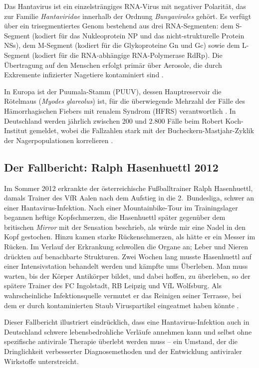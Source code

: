 ﻿\documentclass[a4paper,12pt]{article}
\theoremstyle{definition}
\begin{document}
Das Hantavirus ist ein einzelstr\"angiges RNA-Virus mit negativer Polarit\"at,
das zur Familie \emph{Hantaviridae} innerhalb der Ordnung \emph{Bunyavirales}
geh\"ort. Es verf\"ugt \"uber ein trisegmentiertes Genom bestehend aus drei
RNA-Segmenten: dem S-Segment (kodiert f\"ur das Nukleoprotein NP und das
nicht-strukturelle Protein NSs), dem M-Segment (kodiert f\"ur die Glykoproteine
Gn und Gc) sowie dem L-Segment (kodiert f\"ur die RNA-abh\"angige RNA-Polymerase
RdRp). Die \"Ubertragung auf den Menschen erfolgt prim\"ar \"uber Aerosole,
die durch Exkremente infizierter Nagetiere kontaminiert sind \cite{Jonsson2010}.

In Europa ist der Puumala-Stamm (PUUV), dessen Hauptreservoir die R\"otelmaus
(\emph{Myodes glareolus}) ist, f\"ur die \"uberwiegende Mehrzahl der F\"alle
des H\"amorrhagischen Fiebers mit renalem Syndrom (HFRS) verantwortlich
\cite{Vaheri2013}. In Deutschland werden j\"ahrlich zwischen 200 und 2.800
F\"alle beim Robert Koch-Institut gemeldet, wobei die Fallzahlen stark
mit der Bucheckern-Mastjahr-Zyklik der Nagerpopulationen korrelieren
\cite{RKI2023}.

\subsection{Der Fallbericht: Ralph Hasenhuettl 2012}

Im Sommer 2012 erkrankte der \"osterreichische Fu{\ss}balltrainer Ralph Hasenhuettl,
damals Trainer des VfR Aalen nach dem Aufstieg in die 2.~Bundesliga, schwer
an einer Hantavirus-Infektion. Nach einer Mountainbike-Tour im Trainingslager
begannen heftige Kopfschmerzen, die Hasenhuettl sp\"ater gegen\"uber dem
britischen \emph{Mirror} mit der Sensation beschrieb, \glqq als w\"urde mir
eine Nadel in den Kopf gestochen\grqq. Hinzu kamen starke R\"uckenschmerzen,
als h\"atte er \glqq ein Messer im R\"ucken\grqq. Im Verlauf der Erkrankung
schwollen die Organe an; Leber und Nieren dr\"uckten auf benachbarte Strukturen.
Zwei Wochen lang musste Hasenhuettl auf einer Intensivstation behandelt werden
und k\"ampfte ums \"Uberleben. \glqq Man muss warten, bis der K\"orper
Antik\"orper bildet, und dabei hoffen, zu \"uberleben\grqq, so der
sp\"atere Trainer des FC Ingolstadt, RB Leipzig und VfL Wolfsburg.
Als wahrscheinliche Infektionsquelle vermutet er das Reinigen seiner
Terrasse, bei dem er durch kontaminierten Staub Viruspartikel eingeatmet
haben k\"onnte \cite{Eurosport2026}.

Dieser Fallbericht illustriert eindr\"ucklich, dass eine Hantavirus-Infektion
auch in Deutschland schwere lebensbedrohliche Verl\"aufe annehmen kann und
selbst ohne spezifische antivirale Therapie \"uberlebt werden muss --
ein Umstand, der die Dringlichkeit verbesserter Diagnosemethoden und der
Entwicklung antiviraler Wirkstoffe unterstreicht.
\end{document}
